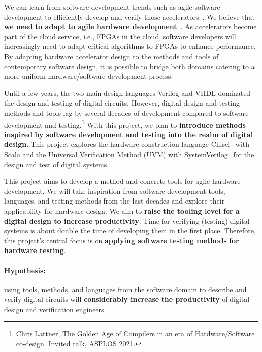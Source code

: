 \documentclass[fleqn,12pt]{article}
\begin{document}
We can learn from software development trends such as agile software development
to efficiently develop and verify those accelerators~\cite{agile:manifesto}.
We believe that {\bf we need to adapt to agile hardware development}~\cite{henn-patt:turing:2019}.
%
As accelerators become part of the cloud service, i.e., FPGAs in the cloud,
software developers will increasingly need to adapt critical algorithms to FPGAs to enhance performance.
By adapting hardware accelerator design to the methods and tools of contemporary software design,
it is possible to bridge both domains catering to a more uniform hardware/software development process.

Until a few years, the two main design languages Verilog and VHDL dominated the
design and testing of digital circuits.
However, digital design and testing methods and tools lag by several decades of development
compared to software development and testing.\footnote{Chris Lattner, The Golden Age of Compilers in an era of Hardware/Software co-design. Invited talk, ASPLOS 2021.}
With this project, we plan to
{\bf introduce methods inspired by software development and testing into the realm of digital design.}
This project explores the hardware construction language Chisel~\cite{chisel:dac2012} with Scala
and the Universal Verification Method (UVM) with SystemVerilog~\cite{SystemVerilog} for
the design and test of digital systems.

This project aims to develop a method and concrete tools for agile hardware development.
{We will take inspiration from software development tools, languages, and testing methods
from the last decades and explore their applicability for hardware design.}
We aim to {\bf raise the tooling level for a digital design to increase productivity}.
Time for verifying (testing) digital systems is about double the time of developing
them in the first place.
Therefore, this project's central focus is on {\bf applying software
testing methods for hardware testing}.


\paragraph{Hypothesis:} using tools, methods, and languages from the
software domain to describe and verify digital circuits will {\bf considerably increase the productivity}
of digital design and verification engineers.
\end{document}

